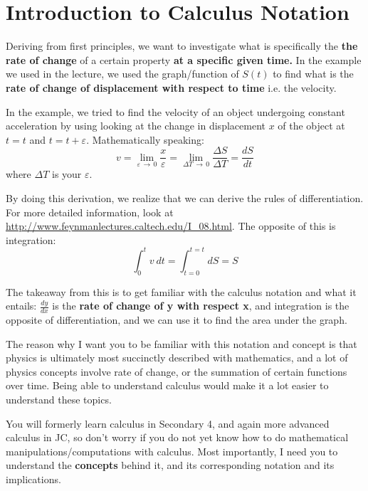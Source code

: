 \documentclass[11pt]{article}
\numberwithin{equation}{section}
\begin{document}
	\pagebreak 
	\tableofcontents	
	\pagebreak
	\section{Introduction to Calculus Notation}
	Deriving from first principles, we want to investigate what is specifically the \textbf{the rate of change} of a certain property \textbf{at a specific given time.} In the example we used in the lecture, we used the graph/function of $S(t)$ to find what is the \textbf{rate of change of displacement with respect to time} i.e. the velocity. 
	
	In the example, we tried to find the velocity of an object undergoing constant acceleration by using looking at the change in displacement $x$ of the object at $t=t$ and $t=t+\varepsilon$. Mathematically speaking:
	\begin{equation}
		v=\lim\limits_{\varepsilon \,\rightarrow\, 0} \frac{x}{\varepsilon}=\lim\limits_{\Delta T \,\rightarrow\, 0} \frac{\Delta S}{\Delta T} =\frac{dS}{dt}
	\end{equation}
	where $\Delta T$ is your $\varepsilon$.
	
	By doing this derivation, we realize that we can derive the rules of differentiation. For more detailed information, look at \url{http://www.feynmanlectures.caltech.edu/I_08.html}. The opposite of this is integration:
	\begin{equation}
		\int_{0}^{t} v~dt = \int_{t=0}^{t=t} dS = S 
	\end{equation}
	
	The takeaway from this is to get familiar with the calculus notation and what it entails: $\frac{dy}{dx}$ is the \textbf{rate of change of y with respect x}, and integration is the opposite of differentiation, and we can use it to find the area under the graph.
	
	\vfill

	\hdashrule{\textwidth}{0.1mm}{1pt}
	
	The reason why I want you to be familiar with this notation and concept is that physics is ultimately most succinctly described with mathematics, and a lot of physics concepts involve rate of change, or the summation of certain functions over time. Being able to understand calculus would make it a lot easier to understand these topics. 
	
	You will formerly learn calculus in Secondary 4, and again more advanced calculus in JC, so don't worry if you do not yet know how to do mathematical manipulations/computations with calculus. Most importantly, I need you to understand the \textbf{concepts} behind it, and its corresponding notation and its implications. 
	
\end{document}
